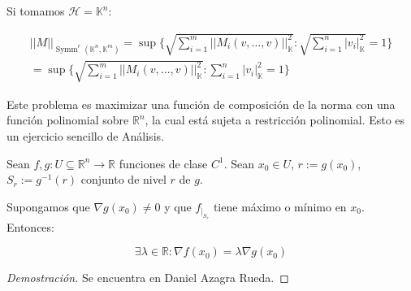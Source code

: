 \begin{rmrk}
	Si tomamos $\mathcal{H} = \mathbb{K}^n$:
	
	\begin{align*}
		||M||_{\operatorname{Symm}^r(\mathbb{K}^n, \mathbb{K}^m)} 
		=  \sup \{\sqrt{\sum_{i =1}^m||M_i(v,\dots,v)||_{\mathbb{K}}^2} : \sqrt{\sum_{i = 1}^n |v_i|_{\mathbb{K}}^2} = 1 \}\\
		=  \sup \{\sqrt{\sum_{i =1}^m||M_i(v,\dots,v)||_{\mathbb{K}}^2} : \sum_{i = 1}^n |v_i|_{\mathbb{K}}^2 = 1 \}
	\end{align*}
	
	Este problema es maximizar una función de composición de la norma con una función polinomial sobre $\mathbb{R}^n$, la cual está sujeta a restricción polinomial. Esto es un ejercicio sencillo de Análisis.  
\end{rmrk}


\begin{thm}
	Sean $f,g: U\subseteq \mathbb{R}^n \to \mathbb{R}$ funciones de clase $C^1$. Sean $x_0 \in U$, $r := g(x_0)$, $S_r := g^{-1}(r) $ conjunto de nivel $r$ de $g$.
	
	Supongamos que $\nabla g(x_0) \neq 0$ y que $f_{|_{S_r}}$ tiene máximo o mínimo en $x_0$. Entonces:
	
	\begin{equation*}
		\exists \lambda \in \mathbb{R} : \nabla f (x_0) = \lambda \nabla g(x_0)
	\end{equation*}
\end{thm}



\begin{proof}[Demostración]
	Se encuentra en Daniel Azagra Rueda.
\end{proof}

